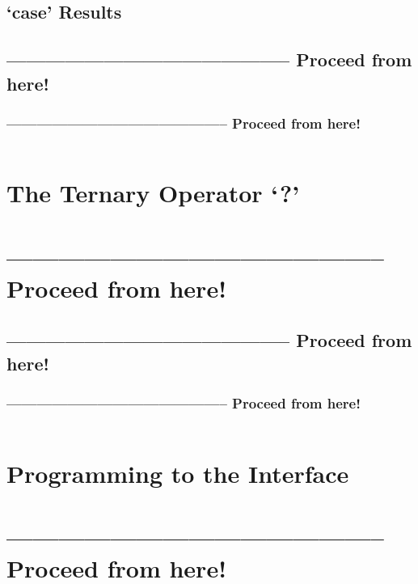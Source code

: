 \documentclass[11pt,a4paper, titlepage, parskip=half, headsepline, footsepline, cleardoublepage=current, headheight=1cm]{scrbook}
\begin{document}
\subsection{‘case’ Results}\label{sec:CaseResults}
\subsection{-------------------------------------------- Proceed from here!}
\subsubsection{-------------------------------------------- Proceed from here!}
\autocite{ORACLE_DOC_SWITCHEXPRESSIONS}
\autocite{}
\autocite{}
\autocite{}
\autocite{}
\autocite{}
\autocite{}
\autocite{}
\autocite{}
\lipsum[5]

\begin{lstlisting}
\end{lstlisting}

\section{The Ternary Operator ‘?’}\label{sec:TheTernaryOperator}
\section{-------------------------------------------- Proceed from here!}
\subsection{-------------------------------------------- Proceed from here!}
\subsubsection{-------------------------------------------- Proceed from here!}
\lipsum[5]

\begin{lstlisting}
\end{lstlisting}

\section{Programming to the Interface}\label{sec:ProgrammingToTheInterface}
\section{-------------------------------------------- Proceed from here!}
\end{document}
